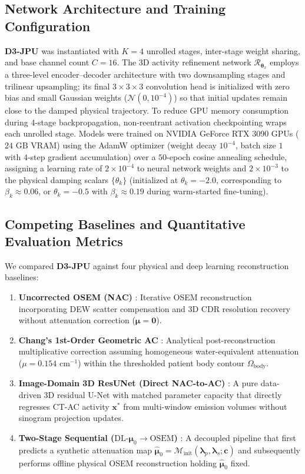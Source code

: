 \documentclass[11pt, a4paper]{article}
\begin{document}
\subsection{Network Architecture and Training Configuration}
\textbf{D3-JPU} was instantiated with $K = 4$ unrolled stages, inter-stage weight sharing, and base channel count $C = 16$. The 3D activity refinement network $\mathcal{R}_{\boldsymbol{\theta}_x}$ employs a three-level encoder--decoder architecture with two downsampling stages and trilinear upsampling; its final $3 \times 3 \times 3$ convolution head is initialized with zero bias and small Gaussian weights ($\mathcal{N}(0, 10^{-4})$) so that initial updates remain close to the damped physical trajectory. To reduce GPU memory consumption during 4-stage backpropagation, non-reentrant activation checkpointing wraps each unrolled stage. Models were trained on NVIDIA GeForce RTX 3090 GPUs ($24\text{ GB}$ VRAM) using the AdamW optimizer (weight decay $10^{-4}$, batch size $1$ with $4$-step gradient accumulation) over a $50$-epoch cosine annealing schedule, assigning a learning rate of $2 \times 10^{-4}$ to neural network weights and $2 \times 10^{-3}$ to the physical damping scalars $\{\theta_k\}$ (initialized at $\theta_k = -2.0$, corresponding to $\beta_k \approx 0.06$, or $\theta_k = -0.5$ with $\beta_k \approx 0.19$ during warm-started fine-tuning).

\subsection{Competing Baselines and Quantitative Evaluation Metrics}
We compared \textbf{D3-JPU} against four physical and deep learning reconstruction baselines:
\begin{enumerate}
    \item \textbf{Uncorrected OSEM (NAC)} \cite{ref29}: Iterative OSEM reconstruction incorporating DEW scatter compensation and 3D CDR resolution recovery without attenuation correction ($\boldsymbol{\mu} = \mathbf{0}$).
    \item \textbf{Chang's 1st-Order Geometric AC} \cite{ref11}: Analytical post-reconstruction multiplicative correction assuming homogeneous water-equivalent attenuation ($\mu = 0.154\text{ cm}^{-1}$) within the thresholded patient body contour $\Omega_{\text{body}}$.
    \item \textbf{Image-Domain 3D ResUNet (Direct NAC-to-AC)} \cite{ref18, ref22}: A pure data-driven 3D residual U-Net with matched parameter capacity that directly regresses CT-AC activity $\mathbf{x}^*$ from multi-window emission volumes without sinogram projection updates.
    \item \textbf{Two-Stage Sequential ($\text{DL-}\boldsymbol{\mu}_0 \to \text{OSEM}$)} \cite{ref17, ref20}: A decoupled pipeline that first predicts a synthetic attenuation map $\hat{\boldsymbol{\mu}}_0 = \mathcal{M}_{\text{init}}(\boldsymbol{\lambda}_p, \boldsymbol{\lambda}_s; \mathbf{c})$ and subsequently performs offline physical OSEM reconstruction holding $\hat{\boldsymbol{\mu}}_0$ fixed.
\end{enumerate}
\end{document}
